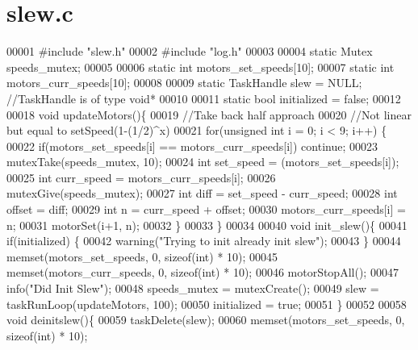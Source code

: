 \section{slew.\+c}
\label{slew_8c_source}

\begin{DoxyCode}
00001 \textcolor{preprocessor}{#include "slew.h"}
00002 \textcolor{preprocessor}{#include "log.h"}
00003 
00004 \textcolor{keyword}{static} Mutex speeds_mutex;
00005 
00006 \textcolor{keyword}{static} \textcolor{keywordtype}{int} motors_set_speeds[10];
00007 \textcolor{keyword}{static} \textcolor{keywordtype}{int} motors_curr_speeds[10];
00008 
00009 \textcolor{keyword}{static} TaskHandle slew = NULL; \textcolor{comment}{//TaskHandle is of type void*}
00010 
00011 \textcolor{keyword}{static} \textcolor{keywordtype}{bool} initialized = \textcolor{keyword}{false};
00012 
00018 \textcolor{keywordtype}{void} updateMotors()\{
00019   \textcolor{comment}{//Take back half approach}
00020   \textcolor{comment}{//Not linear but equal to setSpeed(1-(1/2)^x)}
00021   \textcolor{keywordflow}{for}(\textcolor{keywordtype}{unsigned} \textcolor{keywordtype}{int} i = 0; i < 9; i++) \{
00022     \textcolor{keywordflow}{if}(motors_set_speeds[i] == motors_curr_speeds[i]) \textcolor{keywordflow}{continue};
00023     mutexTake(speeds_mutex, 10);
00024     \textcolor{keywordtype}{int} set\_speed = (motors_set_speeds[i]);
00025     \textcolor{keywordtype}{int} curr\_speed = motors_curr_speeds[i];
00026     mutexGive(speeds_mutex);
00027     \textcolor{keywordtype}{int} diff = set\_speed - curr\_speed;
00028     \textcolor{keywordtype}{int} offset = diff;
00029     \textcolor{keywordtype}{int} n = curr\_speed + offset;
00030     motors_curr_speeds[i] = n;
00031     motorSet(i+1, n);
00032   \}
00033 \}
00034 
00040 \textcolor{keywordtype}{void} init_slew()\{
00041   \textcolor{keywordflow}{if}(initialized) \{
00042     warning(\textcolor{stringliteral}{"Trying to init already init slew"});
00043   \}
00044   memset(motors_set_speeds, 0, \textcolor{keyword}{sizeof}(\textcolor{keywordtype}{int}) * 10);
00045   memset(motors_curr_speeds, 0, \textcolor{keyword}{sizeof}(\textcolor{keywordtype}{int}) * 10);
00046   motorStopAll();
00047   info(\textcolor{stringliteral}{"Did Init Slew"});
00048   speeds_mutex = mutexCreate();
00049   slew = taskRunLoop(updateMotors, 100);
00050   initialized = \textcolor{keyword}{true};
00051 \}
00052 
00058 \textcolor{keywordtype}{void} deinitslew()\{
00059   taskDelete(slew);
00060   memset(motors_set_speeds, 0, \textcolor{keyword}{sizeof}(\textcolor{keywordtype}{int}) * 10);

\end{DoxyCode}
